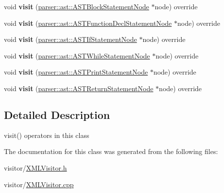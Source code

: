 \begin{DoxyCompactItemize}
void {\bfseries visit} (\hyperlink{classparser_1_1ast_1_1ASTBlockStatementNode}{parser\+::ast\+::\+A\+S\+T\+Block\+Statement\+Node} $\ast$node) override
\item 
\mbox{\label{classvisitor_1_1XMLVisitor_ad6625d7bd09f24a294d6a2dc83ed6132}} 
void {\bfseries visit} (\hyperlink{classparser_1_1ast_1_1ASTFunctionDeclStatementNode}{parser\+::ast\+::\+A\+S\+T\+Function\+Decl\+Statement\+Node} $\ast$node) override
\item 
\mbox{\label{classvisitor_1_1XMLVisitor_aaa8c7eda00cab075e396171cda5d190b}} 
void {\bfseries visit} (\hyperlink{classparser_1_1ast_1_1ASTIfStatementNode}{parser\+::ast\+::\+A\+S\+T\+If\+Statement\+Node} $\ast$node) override
\item 
\mbox{\label{classvisitor_1_1XMLVisitor_aacd004450f9b711b651e6795dea48818}} 
void {\bfseries visit} (\hyperlink{classparser_1_1ast_1_1ASTWhileStatementNode}{parser\+::ast\+::\+A\+S\+T\+While\+Statement\+Node} $\ast$node) override
\item 
\mbox{\label{classvisitor_1_1XMLVisitor_a5c2c22238e97f704d5c28bd20918ca78}} 
void {\bfseries visit} (\hyperlink{classparser_1_1ast_1_1ASTPrintStatementNode}{parser\+::ast\+::\+A\+S\+T\+Print\+Statement\+Node} $\ast$node) override
\item 
\mbox{\label{classvisitor_1_1XMLVisitor_aa293c8a26f718d05abaa6bf602d9d49d}} 
void {\bfseries visit} (\hyperlink{classparser_1_1ast_1_1ASTReturnStatementNode}{parser\+::ast\+::\+A\+S\+T\+Return\+Statement\+Node} $\ast$node) override
\end{DoxyCompactItemize}


\subsection{Detailed Description}
visit() operators in this class 

The documentation for this class was generated from the following files\+:\begin{DoxyCompactItemize}
\item 
visitor/\hyperlink{XMLVisitor_8h}{X\+M\+L\+Visitor.\+h}\item 
visitor/\hyperlink{XMLVisitor_8cpp}{X\+M\+L\+Visitor.\+cpp}\end{DoxyCompactItemize}
